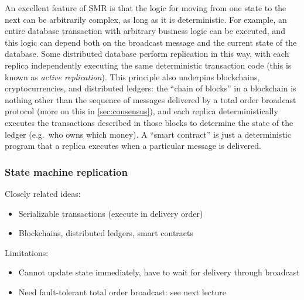 An excellent feature of SMR is that the logic for moving from one state to the next can be arbitrarily complex, as long as it is deterministic.
For example, an entire database transaction with arbitrary business logic can be executed, and this logic can depend both on the broadcast message and the current state of the database.
Some distributed database perform replication in this way, with each replica independently executing the same deterministic transaction code (this is known as \emph{active replication}).
This principle also underpins blockchains, cryptocurrencies, and distributed ledgers: the ``chain of blocks'' in a blockchain is nothing other than the sequence of messages delivered by a total order broadcast protocol (more on this in \autoref{sec:consensus}), and each replica deterministically executes the transactions described in those blocks to determine the state of the ledger (e.g.\ who owns which money).
A ``smart contract'' is just a deterministic program that a replica executes when a particular message is delivered.

\begin{frame}
    \label{s:smr2}
    \frametitle{State machine replication}
    \pause\vspace*{0.5em}
    Closely related ideas:
    \begin{itemize}
        \item Serializable transactions (execute in delivery order)\pause
        \item Blockchains, distributed ledgers, smart contracts\pause
    \end{itemize}
    Limitations:
    \begin{itemize}
        \item Cannot update state immediately, have to wait for delivery through broadcast\pause
        \item Need fault-tolerant total order broadcast: see next lecture
    \end{itemize}
\end{frame}
\label{l:smr2}

